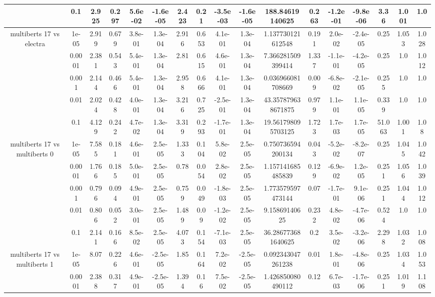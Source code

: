 \begin{tabular}{|c|c|c|c|c|c|c|c|c|c|c|c|c|c|c|c|c|}
 & 0.1 & 2.925 & 0.297 & 5.6e-02 & -1.6e-05 & 2.423 & 0.21 & -3.5e-03 & -1.6e-05 & 188.84619140625 & 0.263 & -1.2e-01 & -9.8e-06 & 3.36 & 1.001 & 1.0 \\
\hline
\multirow{5}{*}{multiberts 17 vs electra } & 1e-05 & 2.919 & 0.679 & 3.8e-01 & 1.3e-04 & 2.916 & 0.653 & 4.1e-01 & 1.3e-04 & 1.137730121612548 & 0.191 & 2.0e-02 & -2.4e-05 & 0.25 & 1.053 & 1.028 \\
 & 0.0001 & 2.381 & 0.543 & 5.4e-01 & 1.3e-04 & 2.81 & 0.615 & 4.6e-01 & 1.3e-04 & 7.366281509399414 & 1.337 & -1.1e-01 & -4.2e-05 & 0.25 & 1.0 & 1.012 \\
 & 0.001 & 2.144 & 0.466 & 5.4e-01 & 1.3e-04 & 2.958 & 0.666 & 4.1e-01 & 1.3e-04 & 0.036966081708669 & 0.009 & -6.8e-02 & -2.1e-05 & 0.255 & 1.0 & 1.0 \\
 & 0.01 & 2.024 & 0.428 & 4.0e-01 & 1.3e-04 & 3.216 & 0.725 & -2.5e-01 & 1.3e-04 & 43.357879638671875 & 0.979 & 1.1e-01 & 1.1e-05 & 0.339 & 1.0 & 1.0 \\
 & 0.1 & 4.129 & 0.242 & 4.7e-02 & 1.3e-04 & 3.319 & 0.293 & -1.7e-01 & 1.3e-04 & 19.561798095703125 & 1.723 & 1.7e-03 & 1.7e-05 & 51.063 & 1.001 & 1.08 \\
\hline
\multirow{5}{*}{multiberts 17 vs multiberts 0} & 1e-05 & 7.585 & 0.181 & 4.6e-01 & 2.5e-05 & 1.333 & 0.104 & 5.8e-02 & 2.5e-05 & 0.750736594200134 & 0.043 & -5.2e-02 & -8.2e-07 & 0.25 & 1.045 & 1.042 \\
 & 0.0001 & 1.766 & 0.185 & 5.0e-01 & 2.5e-05 & 0.78 & 0.054 & 2.8e-02 & 2.5e-05 & 1.157141685485839 & 0.129 & -6.9e-02 & 1.2e-05 & 0.251 & 1.056 & 1.039 \\
 & 0.001 & 0.796 & 0.094 & 4.9e-01 & 2.5e-05 & 0.759 & 0.049 & -1.8e-03 & 2.5e-05 & 1.773579597473144 & 0.07 & -1.7e-01 & 9.1e-06 & 0.251 & 1.044 & 1.012 \\
 & 0.01 & 0.806 & 0.052 & 3.0e-01 & 2.5e-05 & 1.489 & 0.09 & -1.2e-02 & 2.5e-05 & 9.15869140625 & 0.232 & 4.8e-02 & -4.7e-06 & 0.524 & 1.0 & 1.0 \\
 & 0.1 & 2.141 & 0.166 & 8.5e-02 & 2.5e-05 & 4.073 & 0.154 & -7.1e-03 & 2.5e-05 & 36.286773681640625 & 0.2 & 3.5e-02 & -3.2e-06 & 2.298 & 1.032 & 1.008 \\
\hline
\multirow{5}{*}{multiberts 17 vs multiberts 1} & 1e-05 & 8.07 & 0.226 & 4.6e-01 & -2.5e-05 & 1.85 & 0.164 & 7.2e-02 & -2.5e-05 & 0.092343047261238 & 0.01 & 1.8e-01 & -4.8e-06 & 0.25 & 1.034 & 1.053 \\
 & 0.0001 & 2.388 & 0.317 & 4.9e-01 & -2.5e-05 & 1.394 & 0.16 & 7.5e-02 & -2.5e-05 & 1.426850080490112 & 0.12 & 6.7e-03 & -1.7e-06 & 0.251 & 1.019 & 1.108 \\

\end{tabular}
